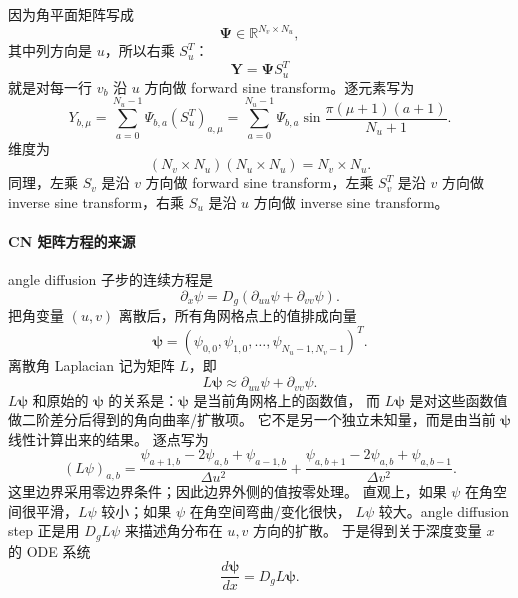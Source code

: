 \documentclass[11pt,a4paper]{ctexart}
\begin{document}
因为角平面矩阵写成
\begin{equation}
  \mathbf\Psi\in\mathbb R^{N_v\times N_u},
\end{equation}
其中列方向是 \(u\)，所以右乘 \(S_u^T\)：
\begin{equation}
  \mathbf Y=\mathbf\Psi S_u^T
\end{equation}
就是对每一行 \(v_b\) 沿 \(u\) 方向做 forward sine transform。逐元素写为
\begin{equation}
  Y_{b,\mu}
  =
  \sum_{a=0}^{N_u-1}
  \Psi_{b,a}(S_u^T)_{a,\mu}
  =
  \sum_{a=0}^{N_u-1}
  \Psi_{b,a}
  \sin\frac{\pi(\mu+1)(a+1)}{N_u+1}.
\end{equation}
维度为
\begin{equation}
  (N_v\times N_u)(N_u\times N_u)=N_v\times N_u.
\end{equation}
同理，左乘 \(S_v\) 是沿 \(v\) 方向做 forward sine transform，左乘 \(S_v^T\)
是沿 \(v\) 方向做 inverse sine transform，右乘 \(S_u\) 是沿 \(u\) 方向做 inverse sine transform。

\paragraph{CN 矩阵方程的来源}
angle diffusion 子步的连续方程是
\begin{equation}
  \partial_x\psi
  =
  D_g(\partial_{uu}\psi+\partial_{vv}\psi).
\end{equation}
把角变量 \((u,v)\) 离散后，所有角网格点上的值排成向量
\begin{equation}
  \boldsymbol\psi
  =
  (\psi_{0,0},\psi_{1,0},\ldots,\psi_{N_u-1,N_v-1})^T.
\end{equation}
离散角 Laplacian 记为矩阵 \(L\)，即
\begin{equation}
  L\boldsymbol\psi
  \approx
  \partial_{uu}\psi+\partial_{vv}\psi.
\end{equation}
\(L\boldsymbol\psi\) 和原始的 \(\boldsymbol\psi\) 的关系是：\(\boldsymbol\psi\) 是当前角网格上的函数值，
而 \(L\boldsymbol\psi\) 是对这些函数值做二阶差分后得到的角向曲率/扩散项。
它不是另一个独立未知量，而是由当前 \(\boldsymbol\psi\) 线性计算出来的结果。
逐点写为
\begin{equation}
  (L\psi)_{a,b}
  =
  \frac{\psi_{a+1,b}-2\psi_{a,b}+\psi_{a-1,b}}{\Delta u^2}
  +
  \frac{\psi_{a,b+1}-2\psi_{a,b}+\psi_{a,b-1}}{\Delta v^2}.
\end{equation}
这里边界采用零边界条件；因此边界外侧的值按零处理。
直观上，如果 \(\psi\) 在角空间很平滑，\(L\psi\) 较小；如果 \(\psi\) 在角空间弯曲/变化很快，
\(L\psi\) 较大。angle diffusion step 正是用 \(D_gL\psi\) 来描述角分布在 \(u,v\) 方向的扩散。
于是得到关于深度变量 \(x\) 的 ODE 系统
\begin{equation}
  \frac{d\boldsymbol\psi}{dx}
  =
  D_gL\boldsymbol\psi.
\end{equation}
\end{document}
